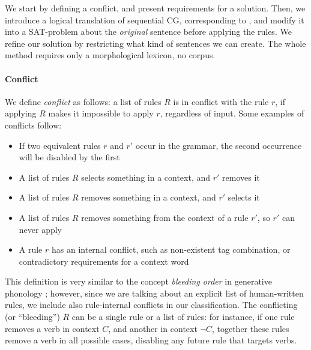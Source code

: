 We start by defining a conflict, and present requirements for a solution.
Then, we introduce a logical translation of sequential CG, corresponding to \citet{lager_nivre01}, and modify it into a SAT-problem about the \emph{original} sentence before applying the rules.
We refine our solution by restricting what kind of sentences we can create.
The whole method requires only a morphological lexicon, no corpus.

\paragraph{Conflict}

We define \emph{conflict} as follows: a list of rules $R$ is in conflict with the rule $r$, if applying $R$ makes it impossible to apply $r$, regardless of input.
Some examples of conflicts follow:

\begin{itemize}
\item If two equivalent rules $r$ and $r'$ occur in the grammar, the second occurrence will be disabled by the first
\item A list of rules $R$ selects something in a context, and $r'$ removes it
\item A list of rules $R$ removes something in a context, and $r'$ selects it
\item A list of rules $R$ removes something from the context of a rule $r'$, so $r'$ can never apply
\item A rule $r$ has an internal conflict, such as non-existent
tag combination, or contradictory requirements for a context word
\end{itemize}

This definition is very similar to the concept \emph{bleeding order} in generative phonology \cite{kiparsky1968}; however, since we are talking about an explicit list of
human-written rules, we include also rule-internal conflicts in our classification.
The conflicting (or ``bleeding'') $R$ can be a single rule or a list of rules: for instance, if one rule removes a verb in
context $C$, and another in context $\neg C$, together these rules
remove a verb in all possible cases, disabling any future rule that
targets verbs.



